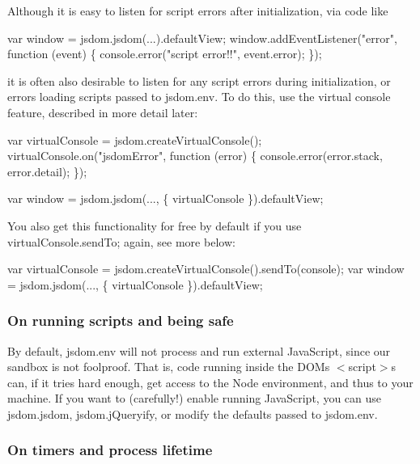 Although it is easy to listen for script errors after initialization, via code like


\begin{DoxyCode}
var window = jsdom.jsdom(...).defaultView;
window.addEventListener("error", function (event) \{
  console.error("script error!!", event.error);
\});
\end{DoxyCode}


it is often also desirable to listen for any script errors during initialization, or errors loading scripts passed to {\ttfamily jsdom.\+env}. To do this, use the virtual console feature, described in more detail later\+:


\begin{DoxyCode}
var virtualConsole = jsdom.createVirtualConsole();
virtualConsole.on("jsdomError", function (error) \{
  console.error(error.stack, error.detail);
\});

var window = jsdom.jsdom(..., \{ virtualConsole \}).defaultView;
\end{DoxyCode}


You also get this functionality for free by default if you use {\ttfamily virtual\+Console.\+send\+To}; again, see more below\+:


\begin{DoxyCode}
var virtualConsole = jsdom.createVirtualConsole().sendTo(console);
var window = jsdom.jsdom(..., \{ virtualConsole \}).defaultView;
\end{DoxyCode}


\subsubsection*{On running scripts and being safe}

By default, {\ttfamily jsdom.\+env} will not process and run external Java\+Script, since our sandbox is not foolproof. That is, code running inside the D\+OM\textquotesingle{}s {\ttfamily $<$script$>$}s can, if it tries hard enough, get access to the Node environment, and thus to your machine. If you want to (carefully!) enable running Java\+Script, you can use {\ttfamily jsdom.\+jsdom}, {\ttfamily jsdom.\+j\+Queryify}, or modify the defaults passed to {\ttfamily jsdom.\+env}.

\subsubsection*{On timers and process lifetime}

